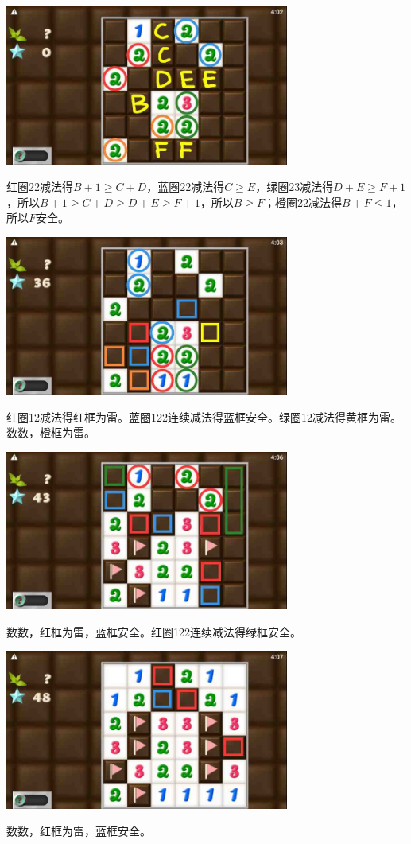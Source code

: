 \subsection{} %
\begin{center}
    \includegraphics[width=0.7\textwidth]{puzzlelow/244-1.jpg}
\end{center}
红圈22减法得$B+1\ge C+D$，蓝圈22减法得$C\ge E$，绿圈23减法得$D+E\ge F+1$，所以$B+1\ge C+D\ge D+E\ge F+1$，所以$B\ge F$；橙圈22减法得$B+F\le 1$，所以$F$安全。
\begin{center}
    \includegraphics[width=0.7\textwidth]{puzzlelow/244-2.jpg}
\end{center}
红圈12减法得红框为雷。蓝圈122连续减法得蓝框安全。绿圈12减法得黄框为雷。数数，橙框为雷。
\begin{center}
    \includegraphics[width=0.7\textwidth]{puzzlelow/244-3.jpg}
\end{center}
数数，红框为雷，蓝框安全。红圈122连续减法得绿框安全。
\begin{center}
    \includegraphics[width=0.7\textwidth]{puzzlelow/244-4.jpg}
\end{center}
数数，红框为雷，蓝框安全。

